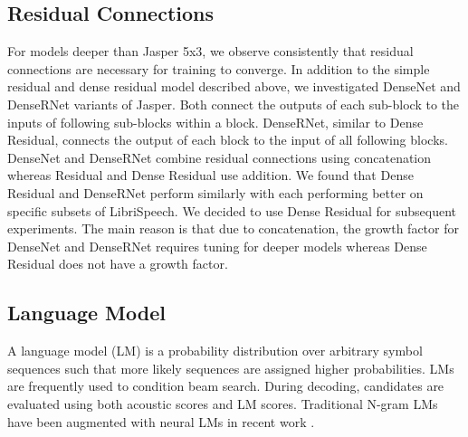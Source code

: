\documentclass[a4paper]{article}
\begin{document}
\subsection{Residual Connections}
For models deeper than Jasper 5x3, we observe consistently that residual connections are necessary for training to converge. In addition to the simple residual and dense residual model described above, we investigated DenseNet \cite{huang2016} and DenseRNet \cite{Tang2018} variants of Jasper. Both connect the outputs of each sub-block to the inputs of following sub-blocks within a block. DenseRNet, similar to Dense Residual, connects the output of each block to the input of all following blocks. DenseNet and DenseRNet combine residual connections using concatenation whereas Residual and Dense Residual use addition. We found that Dense Residual and DenseRNet perform similarly with each performing better on specific subsets of LibriSpeech. We decided to use Dense Residual for subsequent experiments. The main reason is that due to concatenation, the growth factor for DenseNet and DenseRNet requires tuning for deeper models whereas Dense Residual does not have a growth factor.

\begin{table}[th]
\centering
\caption{Residual Connections: Greedy WER, LibriSpeech for Jasper 10x3 after 400 epochs.  All models sized to have roughly the same parameter count.}
\label{tab:Res}
\end{table}

\subsection{Language Model}
A language model (LM) is a probability distribution over arbitrary symbol sequences  such that more likely sequences are assigned higher probabilities. LMs are frequently used to condition beam search. During decoding, candidates are evaluated using both acoustic scores and LM scores. Traditional N-gram LMs have been augmented with neural LMs in recent work \cite{zeyer2018improved, Povey2018SemiOrthogonalLM, CAPIO2017}.
\end{document}

